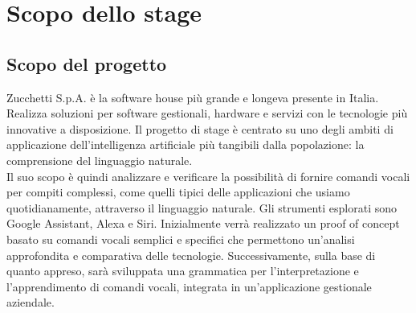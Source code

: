 \section{Scopo dello stage}
\subsection{Scopo del progetto}
Zucchetti S.p.A. è la software house più grande e longeva presente in Italia. Realizza soluzioni per software gestionali, hardware e servizi con le tecnologie più innovative a disposizione.
Il progetto di stage è centrato su uno degli ambiti di applicazione dell'intelligenza artificiale più tangibili dalla popolazione: la comprensione del linguaggio naturale. \\
Il suo scopo è quindi analizzare e verificare la possibilità di fornire comandi vocali per compiti complessi, come quelli tipici delle applicazioni che usiamo quotidianamente, attraverso il linguaggio naturale. Gli strumenti esplorati sono Google Assistant, Alexa e Siri.
Inizialmente verrà realizzato un proof of concept basato su comandi vocali semplici e specifici che permettono un'analisi approfondita e comparativa delle tecnologie. Successivamente, sulla base di quanto appreso, sarà sviluppata una grammatica per l'interpretazione e l'apprendimento di comandi vocali, integrata in un'applicazione gestionale aziendale.

